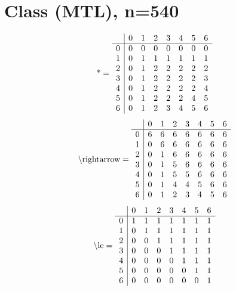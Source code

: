 \documentclass[11pt]{article}
\begin{document}
\section{Class (MTL), n=540}
\[\text{*} = 
\begin{array}{r | r r r r r r r}
 & 0 & 1 & 2 & 3 & 4 & 5 & 6 \\ \hline
0 & 0 & 0 & 0 & 0 & 0 & 0 & 0 \\
1 & 0 & 1 & 1 & 1 & 1 & 1 & 1 \\
2 & 0 & 1 & 2 & 2 & 2 & 2 & 2 \\
3 & 0 & 1 & 2 & 2 & 2 & 2 & 3 \\
4 & 0 & 1 & 2 & 2 & 2 & 2 & 4 \\
5 & 0 & 1 & 2 & 2 & 2 & 4 & 5 \\
6 & 0 & 1 & 2 & 3 & 4 & 5 & 6 \\
\end{array}
\]
\[\text{\textbackslash rightarrow} = 
\begin{array}{r | r r r r r r r}
 & 0 & 1 & 2 & 3 & 4 & 5 & 6 \\ \hline
0 & 6 & 6 & 6 & 6 & 6 & 6 & 6 \\
1 & 0 & 6 & 6 & 6 & 6 & 6 & 6 \\
2 & 0 & 1 & 6 & 6 & 6 & 6 & 6 \\
3 & 0 & 1 & 5 & 6 & 6 & 6 & 6 \\
4 & 0 & 1 & 5 & 5 & 6 & 6 & 6 \\
5 & 0 & 1 & 4 & 4 & 5 & 6 & 6 \\
6 & 0 & 1 & 2 & 3 & 4 & 5 & 6 \\
\end{array}
\]
\[\text{\textbackslash le} = 
\begin{array}{r | r r r r r r r}
 & 0 & 1 & 2 & 3 & 4 & 5 & 6 \\ \hline
0 & 1 & 1 & 1 & 1 & 1 & 1 & 1 \\
1 & 0 & 1 & 1 & 1 & 1 & 1 & 1 \\
2 & 0 & 0 & 1 & 1 & 1 & 1 & 1 \\
3 & 0 & 0 & 0 & 1 & 1 & 1 & 1 \\
4 & 0 & 0 & 0 & 0 & 1 & 1 & 1 \\
5 & 0 & 0 & 0 & 0 & 0 & 1 & 1 \\
6 & 0 & 0 & 0 & 0 & 0 & 0 & 1 \\
\end{array}
\]
\end{document}
